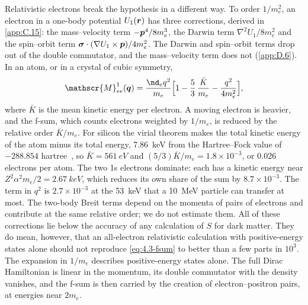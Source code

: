 Relativistic electrons break the hypothesis in a different way. To order $1/m_e^2$, an electron in a one-body potential $U_1(\bm{r})$ has three corrections, derived in \cref{app:C.15}: the mass--velocity term $-\bm{p}^4/8m_e^3$, the Darwin term $\nabla^2U_1/8m_e^2$ and the spin--orbit term $\bm{\sigma}\cdot(\nabla U_1\times\bm{p})/4m_e^2$. The Darwin and spin--orbit terms drop out of the double commutator, and the mass--velocity term does not (\cref{app:D.6}). In an atom, or in a crystal of cubic symmetry,
\begin{equation}
  \mathscr{M}^1_{ee}(\vect{q}) = \frac{\nd_eq^2}{m_e}\Bigl[1 - \frac53\,\frac{\bar K}{m_e} - \frac{q^2}{4m_e^2}\Bigr] ,
  \label{eq:4.3-mv}
\end{equation}
where $\bar K$ is the mean kinetic energy per electron. A moving electron is heavier, and the f-sum, which counts electrons weighted by $1/m_e$, is reduced by the relative order $\bar K/m_e$. For silicon the virial theorem makes the total kinetic energy of the atom minus its total energy, \SI{7.86}{keV} from the Hartree--Fock value of $-288.854$ hartree~\cite{bunge1993roothaan}, so $\bar K = \SI{561}{eV}$ and $(5/3)\bar K/m_e = 1.8\times10^{-3}$, or 0.026 electrons per atom. The two 1s electrons dominate: each has a kinetic energy near $Z^2\alpha^2m_e/2 = \SI{2.67}{keV}$, which reduces its own share of the sum by $8.7\times10^{-3}$. The term in $q^2$ is $2.7\times10^{-3}$ at the \SI{53}{keV} that a \SI{10}{MeV} particle can transfer at most. The two-body Breit terms depend on the momenta of pairs of electrons and contribute at the same relative order; we do not estimate them. All of these corrections lie below the accuracy of any calculation of $S$ for dark matter. They do mean, however, that an all-electron relativistic calculation with positive-energy states alone should not reproduce \cref{eq:4.3-fsum} to better than a few parts in $10^3$. The expansion in $1/m_e$ describes positive-energy states alone. The full Dirac Hamiltonian is linear in the momentum, its double commutator with the density vanishes, and the f-sum is then carried by the creation of electron--positron pairs, at energies near $2m_e$.

